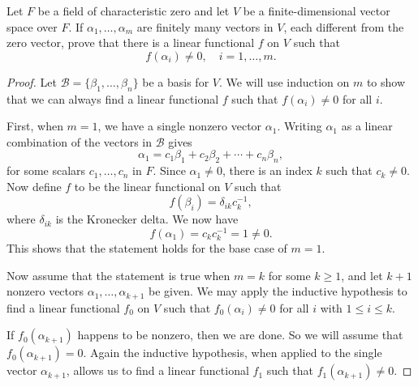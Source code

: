  Let $F$ be a field of characteristic zero and let $V$ be
a finite-dimensional vector space over $F$. If
$\alpha_1,\dots,\alpha_m$ are finitely many vectors in $V$, each
different from the zero vector, prove that there is a linear
functional $f$ on $V$ such that
\begin{equation*}
  f(\alpha_i) \neq 0, \quad i = 1, \dots, m.
\end{equation*}
\begin{proof}
  Let $\mathcal{B} = \{\beta_1,\dots,\beta_n\}$ be a basis for $V$. We
  will use induction on $m$ to show that we can always find a linear
  functional $f$ such that $f(\alpha_i)\neq0$ for all $i$.

  First, when $m = 1$, we have a single nonzero vector
  $\alpha_1$. Writing $\alpha_1$ as a linear combination of the
  vectors in $\mathcal{B}$ gives
  \begin{equation*}
    \alpha_1 = c_1\beta_1 + c_2\beta_2 + \cdots + c_n\beta_n,
  \end{equation*}
  for some scalars $c_1,\dots,c_n$ in $F$. Since $\alpha_1\neq0$,
  there is an index $k$ such that $c_k\neq0$. Now define $f$ to be the
  linear functional on $V$ such that
  \begin{equation*}
    f(\beta_i) = \delta_{ik}c_k^{-1},
  \end{equation*}
  where $\delta_{ik}$ is the Kronecker delta. We now have
  \begin{equation*}
    f(\alpha_1) = c_kc_k^{-1} = 1 \neq 0.
  \end{equation*}
  This shows that the statement holds for the base case of $m = 1$.

  Now assume that the statement is true when $m = k$ for some
  $k\geq1$, and let $k + 1$ nonzero vectors
  $\alpha_1,\dots,\alpha_{k+1}$ be given. We may apply the inductive
  hypothesis to find a linear functional $f_0$ on $V$ such that
  $f_0(\alpha_i) \neq 0$ for all $i$ with $1\leq i\leq k$.

  If $f_0(\alpha_{k+1})$ happens to be nonzero, then we are done. So
  we will assume that $f_0(\alpha_{k+1}) = 0$. Again the inductive
  hypothesis, when applied to the single vector $\alpha_{k+1}$, allows
  us to find a linear functional $f_1$ such that
  $f_1(\alpha_{k+1})\neq0$.


\end{proof}
